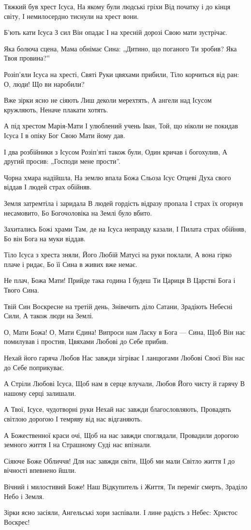 Тяжкий був хрест Ісуса,
На якому були людські гріхи
Від початку і до кінця світу,
І немилосердно тиснули на хрест вони.

Б’ють кати Ісуса
З сил Він опадає
І на хресній дорозі
Свою мати зустрічає.

Яка болюча сцена,
Мама обнімає Сина:
„Дитино, що поганого Ти зробив?
Яка Твоя провина?”

Розіп’яли Ісуса на хресті,
Святі Руки цвяхами прибили,
Тіло корчиться від ран:
О, люди! Що ви наробили?

Вже зірки ясно не сіяють
Лиш деколи мерехтять,
А ангели над Ісусом кружляють,
Неначе плакати хотять.

А під хрестом Марія-Мати
І улюблений учень Іван,
Той, що ніколи не покидав Ісуса
І в опіку Бог Свою Мати йому дав.

І два розбійники з Ісусом
Розіп’яті також були,
Один кричав і богохулив,
А другий просив: „Господи мене прости”.

Чорна хмара надійшла,
На землю впала Божа Сльоза
Ісус Отцеві Духа свого віддав
І людей страх обійняв.

Земля затремтіла і заридала
В людей гордість відразу пропала
І страх їх огорнув несамовито,
Бо Богочоловіка на Землі було вбито.

Захитались Божі храми
Там, де на Ісуса неправду казали,
І Пилата страх обійняв,
Бо він Бога на муки віддав.

Тіло Ісуса з хреста зняли,
Його Любій Матусі на руки поклали,
А вона гірко плаче і ридає,
Бо її Сина в живих вже немає.

Не плач, Божа Мати!
Прийде така година
І будеш Ти Цариця
В Царстві Бога і Твого Сина.

Твій Син Воскресне на третій день,
Знівечить діло Сатани,
Зрадіють Небесні Сили,
А також люди на Землі.

О, Мати Божа! О, Мати Єдина!
Випроси нам Ласку в Бога --- Сина,
Щоб Він нас помилував і простив,
Цвяхами Любові до Себе прибив.

Нехай його гаряча Любов
Нас завжди зігріває
І ланцюгами Любові Своєї
Він нас до Себе поприкуває.

А Стріли Любові Ісуса,
Щоб нам в серце влучали,
Любов Його чисту й гарячу
В нашому серці залишали.

А Твої, Ісусе, чудотворні руки
Нехай нас завжди благословляють,
Провадять світлою дорогою
І темряву від нас відганяють.

А Божественної краси очі,
Щоб на нас завжди споглядали,
Провадили дорогою земного життя
І на Страшному Суді нас впізнали.

Сіяюче Боже Обличчя!
Для нас завжди світи,
Щоб ми мали Світло життя
І до вічності впевнено йшли.

Вічний і милостивий Боже!
Наш Відкупитель і Життя,
Ти переміг смерть,
Зраділо Небо і Земля.

Зірки ясно засіяли,
Ангельські хори заспівали.
І лине радість з Небес:
Христос Воскрес!
